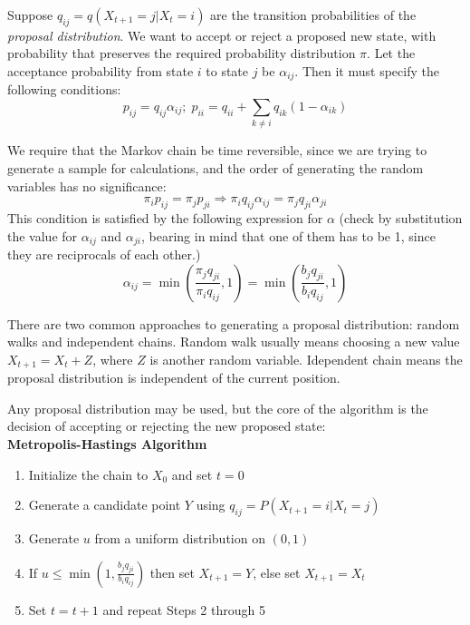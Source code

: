 \documentclass[11pt]{book}
\begin{document}
Suppose $q_{ij} = q(X_{t+1} = j | X_t = i)$ are the transition probabilities of the \emph{proposal distribution}. We want to accept or reject a proposed new state, with probability that preserves the required probability distribution $\pi$. Let the acceptance probability from state $i$ to state $j$ be $\alpha_{ij}$. Then it must specify the following conditions:
$$ p_{ij} = q_{ij}\alpha_{ij}; \; p_{ii} = q_{ii} + \sum_{k \neq i} q_{ik}(1-\alpha_{ik})$$

We require that the Markov chain be time reversible, since we are trying to generate a sample for calculations, and the order of generating the random variables has no significance:
$$ \pi_i p_{ij} = \pi_j p_{ji} \Rightarrow \pi_i q_{ij}\alpha_{ij} = \pi_j q_{ji}\alpha_{ji}$$
This condition is satisfied by the following expression for $\alpha$ (check by substitution the value for $\alpha_{ij}$ and $\alpha_{ji}$, bearing in mind that one of them has to be 1, since they are reciprocals of each other.)
$$ \alpha_{ij} = \min \left( \frac{\pi_j q_{ji}}{\pi_i q_{ij}}, 1\right) = \min \left( \frac{b_j q_{ji}}{b_i q_{ij}}, 1\right)$$

There are two common approaches to generating a proposal distribution: random walks and independent chains. Random walk usually means choosing a new  value $X_{t+1} = X_t + Z$, where $Z$ is another random variable. Idependent chain means the proposal distribution is independent of the current position.

Any proposal distribution may be used, but the core of the algorithm is the decision of accepting or rejecting the new proposed state: \\
\textbf{Metropolis-Hastings Algorithm}
\begin{enumerate}
\item  Initialize the chain to $X_0$ and set $t=0$

\item Generate a candidate point $Y$ using $q_{ij} = P(X_{t+1} = i |X_t = j)$

\item Generate $u$ from a uniform  distribution on $(0,1)$

\item If $ u \leq  \min \left( 1,  \frac{b_j q_{ji}}{b_i q_{ij}} \right) $
then set $X_{t+1} = Y$, else set $X_{t+1} = X_t$

\item Set $t= t+1$ and repeat Steps 2 through 5   

\end{enumerate}
\end{document}

